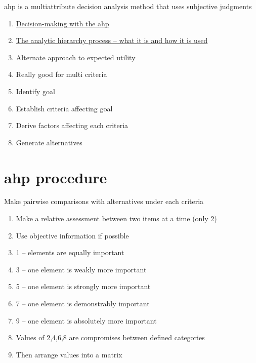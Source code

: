 \documentclass[aspectratio=1610,pdftex,dvipsnames,compress,xcolor={dvipsnames}]{beamer}
\newcommand{\acs}{\acrshort} %
\begin{document}
\addtocounter{framenumber}{-1}
\begin{frame}{\acs{ahp} is a multiattribute decision analysis method that uses subjective judgments}
    \begin{enumerate}[series=outerlist,topsep=0pt,itemsep=13pt,leftmargin=*,label=(\arabic*)]
        \item[]\href{https://www.stat.uchicago.edu/~lekheng/meetings/mathofranking/ref/saaty1.pdf}{Decision-making with the \acs{ahp}}
        \item[]\href{https://www.sciencedirect.com/science/article/pii/0270025587904738}{The analytic hierarchy process -- what it is and how it is used}
        \item[]Alternate approach to expected utility 
        \item[]Really good for multi criteria
        \item[]Identify goal  
        \item[]Establish criteria affecting goal  
        \item[]Derive factors affecting each criteria  
        \item[]Generate alternatives
    \end{enumerate}
\end{frame}


\section{\acs{ahp} procedure}


\addtocounter{framenumber}{-1}
\begin{frame}{Make pairwise comparisons with alternatives under each criteria}
    \begin{enumerate}[series=outerlist,topsep=0pt,itemsep=1pt,leftmargin=*,label=(\arabic*)]
        \item[]Make a relative assessment between two items at a time (only 2)  
        \item[]Use objective information if possible
            \vspace{0.15in}
        \item[]1 -- elements are equally important
        \item[]3 -- one element is weakly more important  
        \item[]5 -- one element is strongly more important  
        \item[]7 -- one element is demonstrably important  
        \item[]9 -- one element is absolutely more important
        \item[]Values of 2,4,6,8 are compromises between defined categories
            \vspace{0.15in}
        \item[]Then arrange values into a matrix
    \end{enumerate}
\end{frame}
\end{document}

